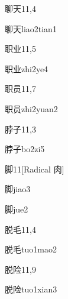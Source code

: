 \begin{entry}{聊天}{11,4}
  \begin{phonetics}{聊天}{liao2tian1}
  \end{phonetics}
\end{entry}

\begin{entry}{职业}{11,5}
  \begin{phonetics}{职业}{zhi2ye4}
  \end{phonetics}
\end{entry}

\begin{entry}{职员}{11,7}
  \begin{phonetics}{职员}{zhi2yuan2}
  \end{phonetics}
\end{entry}

\begin{entry}{脖子}{11,3}
  \begin{phonetics}{脖子}{bo2zi5}
  \end{phonetics}
\end{entry}

\begin{entry}{脚}{11}[Radical 肉]
  \begin{phonetics}{脚}{jiao3}
  \end{phonetics}
  \begin{phonetics}{脚}{jue2}
  \end{phonetics}
\end{entry}

\begin{entry}{脱毛}{11,4}
  \begin{phonetics}{脱毛}{tuo1mao2}
  \end{phonetics}
\end{entry}

\begin{entry}{脱险}{11,9}
  \begin{phonetics}{脱险}{tuo1xian3}
  \end{phonetics}
\end{entry}

